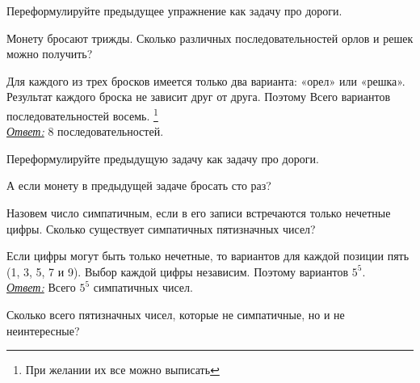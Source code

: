 \begin{ex}\label{u16}
	Переформулируйте предыдущее упражнение как задачу про дороги. 
\end{ex}

\begin{thm}
	Монету бросают трижды. Сколько различных последовательностей орлов и решек можно получить? 
\end{thm}

\begin{prf}
	Для каждого из трех бросков имеется только два варианта: «орел» или «решка». Результат каждого броска не зависит друг от друга. Поэтому Всего вариантов последовательностей восемь. \footnote{При желании их все можно выписать}\\ \underline{\textit{Ответ:}} 8 последовательностей.
\end{prf}

\begin{ex}\label{u17}
	Переформулируйте предыдущую задачу как задачу про дороги. 
\end{ex}

\begin{ex}\label{u18}
	А если монету в предыдущей задаче бросать сто раз?
\end{ex}

\begin{thm}Назовем число симпатичным, если в его записи встречаются только нечетные цифры. Сколько существует симпатичных пятизначных чисел?
\end{thm}

\begin{prf}
	Если цифры могут быть только нечетные, то вариантов для каждой позиции пять (1, 3, 5, 7 и 9). Выбор каждой цифры независим. Поэтому вариантов $5^5$.\\ \textit{\underline{Ответ:}} Всего $5^5$ симпатичных чисел.
\end{prf}

\begin{thm}
	Сколько всего пятизначных чисел, которые не симпатичные, но и не неинтересные?
\end{thm}

